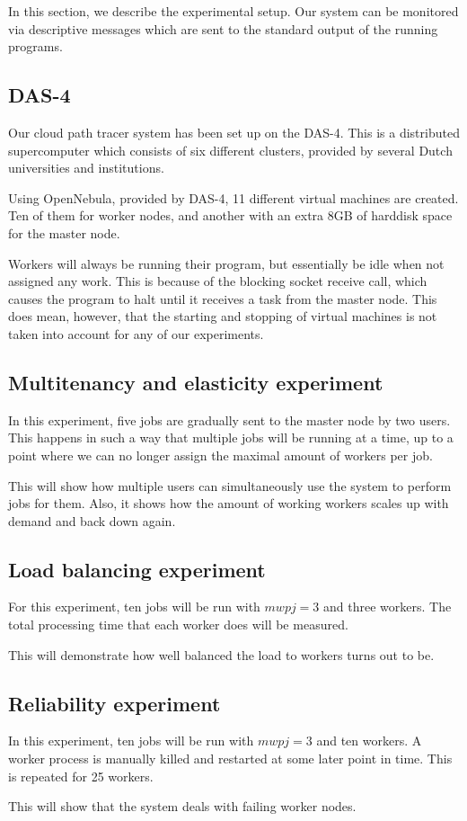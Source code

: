 In this section, we describe the experimental setup.
Our system can be monitored via descriptive messages which are sent to the standard output of the running programs.

\subsection{DAS-4}
Our cloud path tracer system has been set up on the DAS-4\cite{das4}.
This is a distributed supercomputer which consists of six different clusters, provided by several Dutch universities and institutions.

Using OpenNebula, provided by DAS-4, 11 different virtual machines are created.
Ten of them for worker nodes, and another with an extra 8GB of harddisk space for the master node.

Workers will always be running their program, but essentially be idle when not assigned any work.
This is because of the blocking socket receive call, which causes the program to halt until it receives a task from the master node.
This does mean, however, that the starting and stopping of virtual machines is not taken into account for any of our experiments.

\subsection{Multitenancy and elasticity experiment}
In this experiment, five jobs are gradually sent to the master node by two users.
This happens in such a way that multiple jobs will be running at a time, up to a point where we can no longer assign the maximal amount of workers per job.

This will show how multiple users can simultaneously use the system to perform jobs for them.
Also, it shows how the amount of working workers scales up with demand and back down again.

\subsection{Load balancing experiment}
For this experiment, ten jobs will be run with $mwpj = 3$ and three workers.
The total processing time that each worker does will be measured.

This will demonstrate how well balanced the load to workers turns out to be.

\subsection{Reliability experiment}
In this experiment, ten jobs will be run with $mwpj = 3$ and ten workers.
A worker process is manually killed and restarted at some later point in time.
This is repeated for 25 workers.

This will show that the system deals with failing worker nodes.